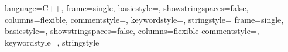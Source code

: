 \titleformat{\chapter}[display]
{\normalfont\huge\bfseries}{}{20pt}{\Huge}
\titlespacing*{\chapter}{0pt}{0pt}{20pt}




\usepackage[shortlabels]{enumitem}
\usepackage{enumerate}







\usepackage{listings}
\usepackage{xcolor}


\lstset{xleftmargin=4pt,xrightmargin=4pt}
\lstset{aboveskip=8pt,belowskip=8pt}
 {
	language=C++,
	frame=single,
	basicstyle=\ttfamily\small,
	showstringspaces=false,
	columns=flexible,
	commentstyle=\color{codegreen},
	keywordstyle=\color{blue},
	stringstyle=\color{codegreen}
}
 {
	frame=single,
	basicstyle=\ttfamily\small,
	showstringspaces=false,
	columns=flexible
    commentstyle=\color{black},
	keywordstyle=\color{black},
    stringstyle=\color{black}
}



\usepackage{graphicx}
